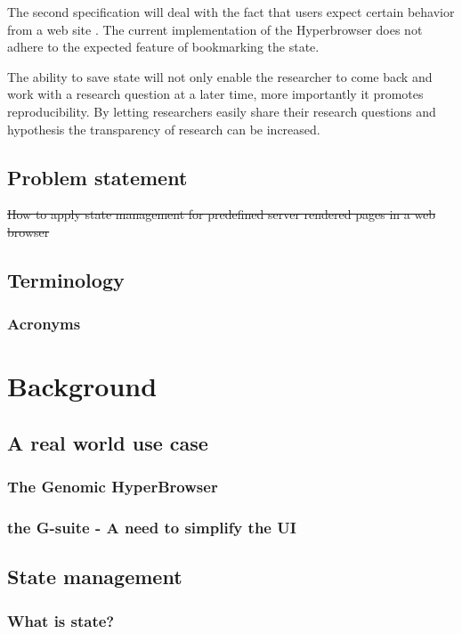 \documentclass[english]{ifimaster}
\begin{document}
The second specification will deal with the fact that users expect certain behavior from a web site \parencite{mikowski} \parencite{nielsen1997user}. The current implementation of the Hyperbrowser does not adhere to the expected feature of bookmarking the state. 

The ability to save state will not only enable the researcher to come back and work with a research question at a later time, more importantly it promotes reproducibility. By letting researchers easily share their research questions and hypothesis the transparency of research can be increased. 


\section{Problem statement}
\sout{How to apply state management for predefined server rendered pages in a web browser}

\section{Terminology}
\subsection{Acronyms}


\chapter{Background}
\section{A real world use case}
\subsection{The Genomic HyperBrowser}
\subsection{the G-suite - A need to simplify the UI}

\section{State management}
\subsection{What is state?}
\end{document}
